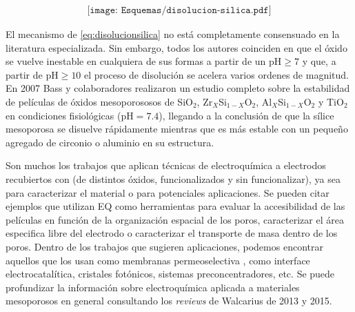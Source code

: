 			\begin{equation}
				\begin{aligned}
				\texttt{[image: Esquemas/disolucion-silica.pdf]}
				\label{eq:disolucionsilica}
				\end{aligned}
				\end{equation} 
	
	El mecanismo de \ref{eq:disolucionsilica} no está completamente consensuado en la literatura especializada. Sin embargo, todos los autores coinciden en que el óxido se vuelve inestable en cualquiera de sus formas a partir de un $\text{pH}\geq7$ y que, a partir de $\text{pH}\geq10$ el proceso de disolución se acelera varios ordenes de magnitud.\cite{Kosmulski2002,Kosmulski2014,Schwarz1984,Si-HanWu2013,iler1979} En 2007 Bass y colaboradores\cite{bass2007} realizaron un estudio completo sobre la estabilidad de películas de óxidos mesoporososos de SiO$_2$, Zr$_X$Si$_{1-X}$O$_2$, Al$_X$Si$_{1-X}$O$_2$ y TiO$_2$ en condiciones fisiológicas (pH$=7.4$), llegando a la conclusión de que la sílice mesoporosa se disuelve rápidamente mientras que es más estable con un pequeño agregado de circonio o aluminio en su estructura.	


	Son muchos los trabajos que aplican técnicas de electroquímica a electrodos recubiertos con \pdm\space (de distintos óxidos, funcionalizados y sin funcionalizar), ya sea para caracterizar el material o para potenciales aplicaciones. Se pueden citar ejemplos que utilizan EQ como herramientas para evaluar la accesibilidad de las películas en función de la organización espacial de los poros\cite{Etienne2007,Herzog2013,karman2016}, caracterizar el área especifica libre del electrodo \cite{Otal2006} o caracterizar el transporte de masa dentro de los poros\cite{Calvo2009,brunsen2011}. Dentro de los trabajos que sugieren aplicaciones, podemos encontrar aquellos que los usan como membranas permeoselectiva \cite{Fattakhova-Rohlfing2007,Andrieu-Brunsen2015,Calvo2009,nasir2018}, como interface electrocatalítica\cite{BaeJ.HanJ.Chung2012}, cristales fotónicos\cite{Gimenez2017}, sistemas preconcentradores\cite{Etienne2015,Gimenez2016-2}, etc. Se puede profundizar la información sobre electroquímica aplicada a materiales mesoporosos en general consultando los \textit{reviews} de Walcarius de 2013\cite{walcarius2013,Etienne2013} y 2015\cite{Etienne2015}.

